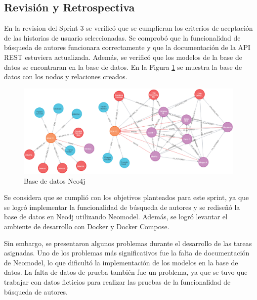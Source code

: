 \subsection{Revisión y Retrospectiva}
En la revision del Sprint 3 se verificó que se cumplieran los criterios de aceptación de las historias de usuario seleccionadas.
Se comprobó que la funcionalidad de búsqueda de autores funcionara correctamente y que la documentación de la API REST estuviera actualizada.
Además, se verificó que los modelos de la base de datos se encontraran en la base de datos.
En la Figura \ref{fig:neo4j-browser} se muestra la base de datos con los nodos y relaciones creados.

\begin{figure}[H]
    \centering
    \includegraphics[scale=0.2]{../02Figures/02Chapter/Sprints/Sprint-3/graph-database.png}
    \caption{Base de datos Neo4j}
    \label{fig:neo4j-browser}
\end{figure}

Se considera que se cumplió con los objetivos planteados para este sprint, ya que se logró implementar la funcionalidad de búsqueda de autores y se rediseñó la base de datos en Neo4j utilizando Neomodel.
Además, se logró levantar el ambiente de desarrollo con Docker y Docker Compose.

Sin embargo, se presentaron algunos problemas durante el desarrollo de las tareas asignadas.
Uno de los problemas más significativos fue la falta de documentación de Neomodel, lo que dificultó la implementación de los modelos en la base de datos.
La falta de datos de prueba también fue un problema, ya que se tuvo que trabajar con datos ficticios para realizar las pruebas de la funcionalidad de búsqueda de autores.